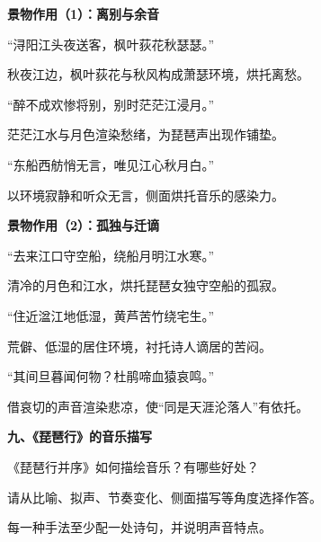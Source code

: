 \documentclass[UTF8,10pt,aspectratio=169]{ctexbeamer}
\newcommand{\PageHeading}[1]{\begin{center}{\Large\bfseries #1}\end{center}\vspace{0.2cm}}
\begin{document}
\begin{frame}
\PageHeading{景物作用（1）：离别与余音}
“浔阳江头夜送客，枫叶荻花秋瑟瑟。”\par\vspace{0.23cm}
秋夜江边，枫叶荻花与秋风构成萧瑟环境，烘托离愁。\par\vspace{0.23cm}
“醉不成欢惨将别，别时茫茫江浸月。”\par\vspace{0.23cm}
茫茫江水与月色渲染愁绪，为琵琶声出现作铺垫。\par\vspace{0.23cm}
“东船西舫悄无言，唯见江心秋月白。”\par\vspace{0.23cm}
以环境寂静和听众无言，侧面烘托音乐的感染力。\par\vspace{0.23cm}
\end{frame}
\begin{frame}
\PageHeading{景物作用（2）：孤独与迁谪}
“去来江口守空船，绕船月明江水寒。”\par\vspace{0.23cm}
清冷的月色和江水，烘托琵琶女独守空船的孤寂。\par\vspace{0.23cm}
“住近湓江地低湿，黄芦苦竹绕宅生。”\par\vspace{0.23cm}
荒僻、低湿的居住环境，衬托诗人谪居的苦闷。\par\vspace{0.23cm}
“其间旦暮闻何物？杜鹃啼血猿哀鸣。”\par\vspace{0.23cm}
借哀切的声音渲染悲凉，使“同是天涯沦落人”有依托。\par\vspace{0.23cm}
\end{frame}
\begin{frame}
\PageHeading{九、《琵琶行》的音乐描写}
《琵琶行并序》如何描绘音乐？有哪些好处？\par\vspace{0.23cm}
请从比喻、拟声、节奏变化、侧面描写等角度选择作答。\par\vspace{0.23cm}
每一种手法至少配一处诗句，并说明声音特点。\par\vspace{0.23cm}
\end{frame}
\end{document}
